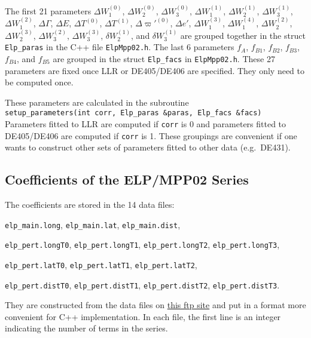 \documentclass[12pt]{article}
\begin{document}
The first 21 parameters $\Delta W_1^{(0)}$, $\Delta W_2^{(0)}$, $\Delta W_3^{(0)}$, 
$\Delta W_1^{(1)}$, $\Delta W_2^{(1)}$, $\Delta W_3^{(1)}$, $\Delta W_1^{(2)}$, 
$\Delta \Gamma$, $\Delta E$, $\Delta T^{(0)}$, $\Delta T^{(1)}$, $\Delta \varpi'^{(0)}$, 
$\Delta e'$, $\Delta W_1^{(3)}$, $\Delta W_1^{(4)}$, $\Delta W_2^{(2)}$, 
$\Delta W_2^{(3)}$, $\Delta W_3^{(2)}$, $\Delta W_3^{(3)}$, $\delta W_2^{(1)}$, 
and $\delta W_3^{(1)}$ are grouped together in the struct {\tt Elp\_paras} 
in the C++ file {\tt ElpMpp02.h}. The last 6 parameters $f_A$, $f_{B1}$, $f_{B2}$, 
$f_{B3}$, $f_{B4}$, and $f_{B5}$ are grouped in the struct {\tt Elp\_facs} 
in {\tt ElpMpp02.h}. These 27 parameters are fixed once LLR or DE405/DE406 are 
specified. They only need to be computed once. 

These parameters are calculated in the subroutine \\
{\tt setup\_parameters(int corr, Elp\_paras \&paras, Elp\_facs \&facs)} \\
Parameters fitted to LLR are computed if {\tt corr} is 0 and parameters
fitted to DE405/DE406 are computed if {\tt corr} is 1. These groupings are 
convenient if one wants to construct other sets of parameters fitted to 
other data (e.g.\ DE431).

\subsection{Coefficients of the ELP/MPP02 Series}
\label{sec:ElpCoefs}

The coefficients are stored in the 14 data files: 

{\tt elp\_main.long}, {\tt elp\_main.lat}, {\tt elp\_main.dist}, 

{\tt elp\_pert.longT0}, {\tt elp\_pert.longT1}, {\tt elp\_pert.longT2}, 
{\tt elp\_pert.longT3},

{\tt elp\_pert.latT0}, {\tt elp\_pert.latT1}, {\tt elp\_pert.latT2}, 

{\tt elp\_pert.distT0}, {\tt elp\_pert.distT1}, {\tt elp\_pert.distT2}, 
{\tt elp\_pert.distT3}. 

They are 
constructed from the data files on 
\href{ftp://cyrano-se.obspm.fr/pub/2_lunar_solutions/2_elpmpp02/}{this ftp site} 
and put in a format more convenient for C++ implementation. 
In each file, the 
first line is an integer indicating the number of terms in the series. 
\end{document}
